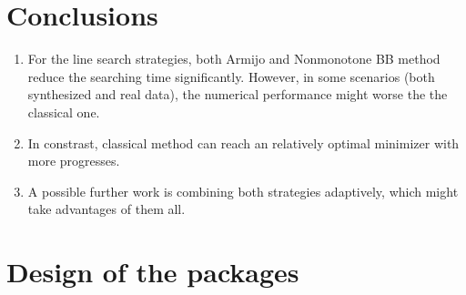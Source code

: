 \documentclass[a4paper]{article}
\begin{document}
  \section{Conclusions}
  \label{sec:concl}
  \begin{enumerate}
    \item For the line search strategies, both Armijo and Nonmonotone BB method reduce the searching time significantly. However, in some scenarios (both synthesized and real data), the numerical performance might worse the the classical one. 
    \item In constrast, classical method can reach an relatively optimal minimizer with more progresses. 
    \item A possible further work is combining both strategies adaptively, which might take advantages of them all. 


  \end{enumerate}
  
  
  
  \appendix
  \renewcommand{\appendixname}{Appendix~\Alph{section}}
  
  
  \section{Design of the packages}
  \label{app:design}
  
\end{document}
